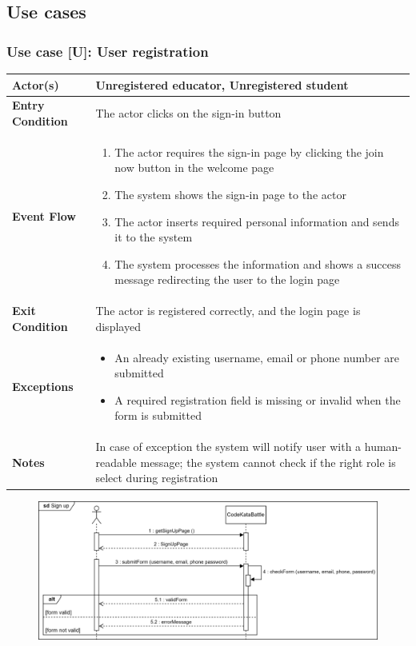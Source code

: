 \documentclass[12pt, a4paper]{report}
\newcounter{useCase}
\newcommand{\usecase}[9]{
    \def\arraystretch{1.5} 
    \subsubsection*{Use case [U#2]: #3}
    \vspace*{0.2cm}
    \begin{center}
        \begin{tabular}{|l|p{12cm}|}
            \hline
            \textbf{Actor(s)} & #4 \\
            \hline
            \textbf{Entry Condition} & #5 \\
            \hline
            \textbf{Event Flow} & #6 \\
            \hline
            \textbf{Exit Condition} & #7 \\
            \hline
            \textbf{Exceptions} & #8 \\
            \hline
            \textbf{Notes} & #9 \\
            \hline
        \end{tabular}
    \end{center}
    #1
}
\begin{document}
    \subsection{Use cases}
    \usecase 
    {\begin{figure}[H]\centering\includegraphics[width=0.9\linewidth]{images/signup.png}\end{figure}}        
    {\arabic{useCase}\stepcounter{useCase}}
    {User registration}
    {Unregistered educator, Unregistered student}
    {The actor clicks on the sign-in button}
    {
    \begin{enumerate}
        \item The actor requires the sign-in page by clicking the join now button in the welcome page
        \item The system shows the sign-in page to the actor
        \item The actor inserts required personal information and sends it to the system
        \item The system processes the information and shows a success message redirecting the user to the login page
    \end{enumerate}
    }
    {The actor is registered correctly, and the login page is displayed}
    {
    \begin{itemize}
        \item An already existing username, email or phone number are submitted
        \item A required registration field is missing or invalid when the form is submitted
    \end{itemize}
    }
    {In case of exception the system will notify user with a human-readable message; the system cannot check if the right role is select during registration}
\end{document}
